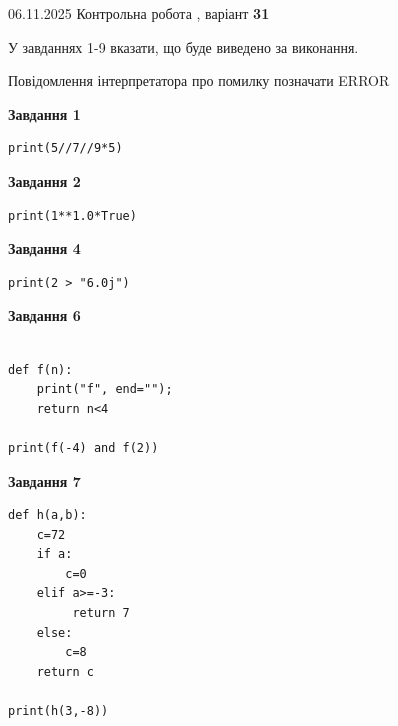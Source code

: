 \documentclass[12pt, ukrainian]{article}
\begin{document}
{\Large{06.11.2025 Контрольна робота , варіант  \No \textbf { 31 }\par}}
{
\begin {large}
У завданнях 1-9 вказати, що буде виведено за виконання.

Повідомлення інтерпретатора про помилку позначати ERROR

\begin{minipage}[t]{7.5cm}

\begin{center}
\textbf{Завдання 1}
\end{center}

\begin{verbatim}
print(5//7//9*5)
\end{verbatim}



\begin{center}
\textbf{Завдання 2}
\end{center}

\begin{verbatim}
print(1**1.0*True)
\end{verbatim}



\begin{center}
\textbf{Завдання 4}
\end{center}

\begin{verbatim}
print(2 > "6.0j")
\end{verbatim}



\begin{center}
\textbf{Завдання 6}
\end{center}

\begin{verbatim}

def f(n):
    print("f", end="");
    return n<4

print(f(-4) and f(2))
\end{verbatim}



\begin{center}
\textbf{Завдання 7}
\end{center}

\begin{verbatim}
def h(a,b):
    c=72
    if a:
        c=0
    elif a>=-3:
         return 7
    else: 
        c=8
    return c

print(h(3,-8))
\end{verbatim}


\end{minipage}
\end{large}}
\end{document}
